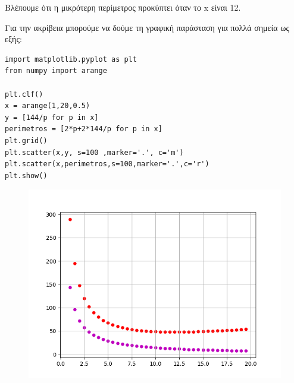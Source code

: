 Βλέπουμε ότι η μικρότερη περίμετρος προκύπτει όταν το x είναι 12.


Για την ακρίβεια μπορούμε να δούμε τη γραφική παράσταση για πολλά σημεία ως εξής:
\begin{lstlisting}
import matplotlib.pyplot as plt
from numpy import arange

plt.clf()
x = arange(1,20,0.5)
y = [144/p for p in x]
perimetros = [2*p+2*144/p for p in x]
plt.grid()
plt.scatter(x,y, s=100 ,marker='.', c='m')
plt.scatter(x,perimetros,s=100,marker='.',c='r')
plt.show()
\end{lstlisting}
\begin{figure}
\includegraphics{graph8.png}
\end{figure}
